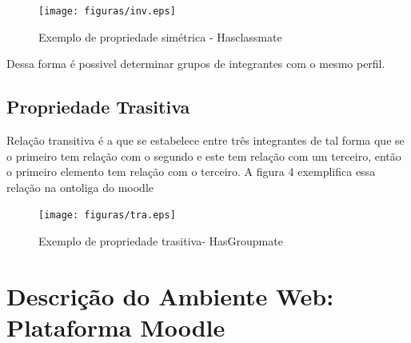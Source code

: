  \begin{figure}[ht]
  \centering
    \texttt{[image: figuras/inv.eps]}
  \caption{Exemplo de propriedade simétrica - Hasclassmate}
\end{figure}

Dessa forma é possivel determinar grupos de integrantes com o mesmo perfil.

\subsection{Propriedade Trasitiva}
Relação transitiva é a que se estabelece entre três integrantes de tal forma que se o primeiro tem relação com o segundo e este tem relação com um terceiro, então o primeiro elemento tem relação com o terceiro. A figura 4 exemplifica essa relação na ontoliga do moodle


 \begin{figure}[ht]
  \centering
    \texttt{[image: figuras/tra.eps]}
  \caption{Exemplo de propriedade trasitiva- HasGroupmate}
\end{figure}

\section{Descrição do Ambiente Web: Plataforma Moodle}

